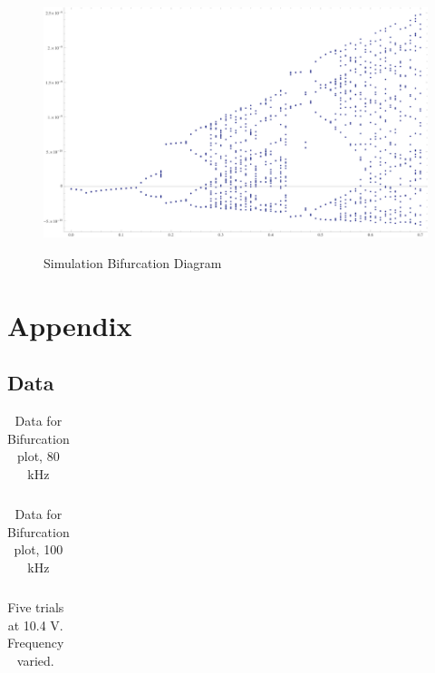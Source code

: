 \documentclass[12pt]{report}
\begin{document}
	\begin{figure}[h]
		\centering
		\includegraphics{simulations/circuit.png}
		\label{fig: Simulation Bifurcation Diagram}
		\caption{Simulation Bifurcation Diagram}
	\end{figure}
	




\chapter*{Appendix}

\section{Data}
\label{sec:Data}

	\begin{table}
		\centering
		\begin{tabular}{|l|l|l||l|l|l|}
			\hline
			 
		\end{tabular}
		\label{tab:80khz}
		\caption{Data for Bifurcation plot, 80 kHz}
	\end{table}

	\begin{table}
		\centering
		\begin{tabular}{|l|l|l|l||l|l|l|l|}
			\hline
			 
		\end{tabular}
		\label{tab:100khz}
		\caption{Data for Bifurcation plot, 100 kHz}
	\end{table}

	\begin{table}
		\centering
		\begin{tabular}{|c|c|c|c|c|}
			\hline
			 
		\end{tabular}
		\label{tab:chaos3}
		\caption{Five trials at 10.4 V. Frequency varied.}
	\end{table}
\end{document}
